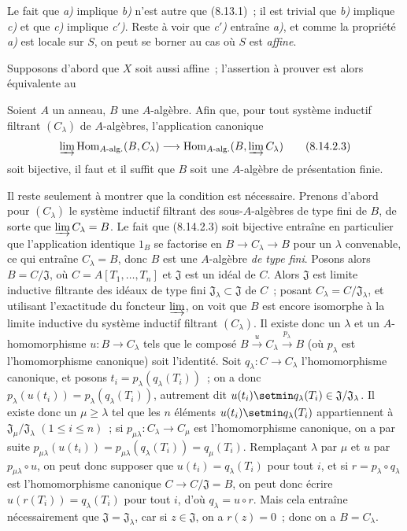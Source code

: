 Le fait que \emph{a)} implique \emph{b)} n'est autre que (8.13.1)~; il est
trivial que \emph{b)} implique \emph{c)} et que \emph{c)} implique
\emph{c$'$)}. Reste à voir que \emph{c$'$)} entraîne \emph{a)}, et comme la
propriété \emph{a)} est locale sur $S$, on peut se borner au cas où $S$ est
\emph{affine}.

Supposons d'abord que $X$ soit aussi affine~; l'assertion à prouver est alors
équivalente au

\begin{corollary}[8.14.2.2]
\label{IV.8.14.2.2-fr}
Soient $A$ un anneau, $B$ une $A$-algèbre. Afin que, pour tout système
inductif filtrant $(C_\lambda)$ de $A$-algèbres, l'application canonique
\begin{equation}
\label{IV.8.14.2.3-fr}
\varinjlim\operatorname{Hom}_{A\text{-}\mathrm{alg.}}(B,C_\lambda)
\longrightarrow
\operatorname{Hom}_{A\text{-}\mathrm{alg.}}
(B,\varinjlim C_\lambda) \tag{8.14.2.3}
\end{equation}
soit bijective, il faut et il suffit que $B$ soit une $A$-algèbre de
présentation finie.
\end{corollary}

Il reste seulement à montrer que la condition est nécessaire. Prenons d'abord
pour $(C_\lambda)$ le système inductif filtrant des sous-$A$-algèbres de type
fini de $B$, de sorte que $\varinjlim C_\lambda=B$. Le fait que (8.14.2.3)
soit bijective entraîne en particulier que l'application identique
$1_B$ se factorise en $B\to C_\lambda\to B$ pour un $\lambda$ convenable,
ce qui entraîne $C_\lambda=B$, donc $B$ est une $A$-algèbre \emph{de type
fini}. Posons alors $B=C/\mathfrak J$, où
$C=A[T_1,\ldots,T_n]$ et $\mathfrak J$ est un idéal de $C$. Alors
$\mathfrak J$ est limite inductive filtrante des idéaux de type fini
$\mathfrak J_\lambda\subset\mathfrak J$ de $C$~; posant
$C_\lambda=C/\mathfrak J_\lambda$, et utilisant l'exactitude du foncteur
$\varinjlim$, on voit que $B$ est encore isomorphe à la limite inductive du
système inductif filtrant $(C_\lambda)$. Il existe donc un $\lambda$ et un
$A$-homomorphisme $u:B\to C_\lambda$ tels que le composé
$B\xrightarrow{u}C_\lambda\xrightarrow{p_\lambda}B$
(où $p_\lambda$ est l'homomorphisme canonique) soit l'identité. Soit
$q_\lambda:C\to C_\lambda$ l'homomorphisme canonique, et posons
$t_i=p_\lambda(q_\lambda(T_i))$~; on a donc
$p_\lambda(u(t_i))=p_\lambda(q_\lambda(T_i))$, autrement dit
$u(t_i)\setmin q_\lambda(T_i)\in\mathfrak J/\mathfrak J_\lambda$.
Il existe donc un $\mu\geqslant\lambda$ tel que les $n$ éléments
$u(t_i)\setmin q_\lambda(T_i)$ appartiennent à
$\mathfrak J_\mu/\mathfrak J_\lambda$ $(1\leqslant i\leqslant n)$~; si
$p_{\mu\lambda}:C_\lambda\to C_\mu$ est l'homomorphisme canonique, on a par
suite
$p_{\mu\lambda}(u(t_i))
=p_{\mu\lambda}(q_\lambda(T_i))=q_\mu(T_i)$.
Remplaçant $\lambda$ par $\mu$ et $u$ par $p_{\mu\lambda}\circ u$, on peut
donc supposer que $u(t_i)=q_\lambda(T_i)$ pour tout $i$, et si
$r=p_\lambda\circ q_\lambda$ est l'homomorphisme canonique
$C\to C/\mathfrak J=B$, on peut donc écrire
$u(r(T_i))=q_\lambda(T_i)$ pour tout $i$, d'où
$q_\lambda=u\circ r$. Mais cela entraîne nécessairement que
$\mathfrak J=\mathfrak J_\lambda$, car si $z\in\mathfrak J$, on a
$r(z)=0$~; donc on a $B=C_\lambda$.

